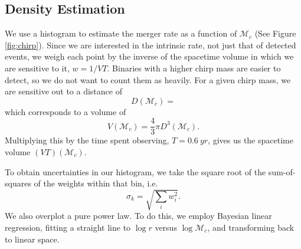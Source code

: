 \subsection{Density Estimation}

We use a histogram to estimate the merger rate as a function of $\mathcal{M}_c$ (See Figure \ref{fig:chirp}). Since we are interested in the intrinsic rate, not just that of detected events, we weigh each point by the inverse of the spacetime volume in which we are sensitive to it, $w = 1 / VT$. Binaries with a higher chirp mass are easier to detect, so we do not want to count them as heavily. For a given chirp mass, we are sensitive out to a distance of
%
\begin{equation}
  D(\mathcal{M}_c) =
\end{equation}
%
which corresponds to a volume of
%
\begin{equation}
  V(\mathcal{M}_c) = \frac{4}{3} \pi D^3(\mathcal{M}_c).
\end{equation}
%
Multiplying this by the time spent observing, $T = \SI{0.6}{yr}$, gives us the spacetime volume $(VT)(\mathcal{M}_c)$.

To obtain uncertainties in our histogram, we take the square root of the sum-of-squares of the weights within that bin, i.e.
%
\begin{equation}
  \sigma_k = \sqrt{\sum_i w_i^2}.
\end{equation}
%
We also overplot a pure power law. To do this, we employ Bayesian linear regression, fitting a straight line to $\log r$ versus $\log \mathcal{M}_c$, and transforming back to linear space.